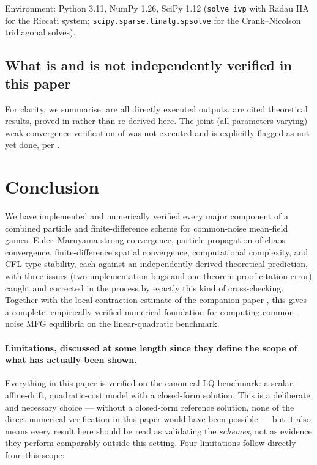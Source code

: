 \documentclass[11pt]{article}
\theoremstyle{remark}
\begin{document}
Environment: Python 3.11, NumPy 1.26, SciPy 1.12 (\texttt{solve\_ivp} with Radau
IIA for the Riccati system; \texttt{scipy.sparse.linalg.spsolve} for the
Crank--Nicolson tridiagonal solves).

\subsection{What is and is not independently verified in this paper}

For clarity, we summarise:  are all directly executed
outputs.  are cited
theoretical results, proved in \citet{monyimba2026paper1,monyimba2026thesis}
rather than re-derived here. The joint (all-parameters-varying) weak-convergence
verification of  was not executed and is explicitly
flagged as not yet done, per .

\section{Conclusion}

We have implemented and numerically verified every major component of a combined
particle and finite-difference scheme for common-noise mean-field games:
Euler--Maruyama
strong convergence, particle propagation-of-chaos convergence, finite-difference
spatial convergence, computational complexity, and CFL-type stability, each against
an independently derived theoretical prediction, with three issues (two
implementation bugs and one theorem-proof citation error)
caught and corrected in the process by exactly this kind of cross-checking. Together
with the local contraction estimate of the companion paper
\citet{monyimba2026paper1}, this gives a complete, empirically verified numerical
foundation for computing common-noise MFG equilibria on the linear-quadratic
benchmark.

\paragraph{Limitations, discussed at some length since they define the scope of
what has actually been shown.} Everything in this paper is verified on the
canonical LQ benchmark: a scalar, affine-drift, quadratic-cost model with a
closed-form solution. This is a deliberate and necessary choice --- without a
closed-form reference solution, none of the direct numerical verification in this
paper would have been possible --- but it also means every result here should be
read as validating the \emph{schemes}, not as evidence they perform comparably
outside this setting. Four limitations follow directly from this scope:
\end{document}
